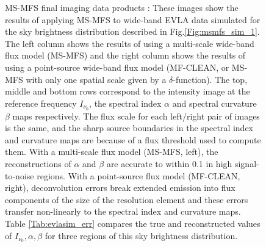 \documentclass[structabstract]{stylefiles/aa}
\begin{document}
\begin{figure}[t!]
\begin{center}
\end{center}
\caption[Example : MS-MFS final imaging data products]
{\small MS-MFS final imaging data products : 
These images show the results of applying MS-MFS to wide-band 
EVLA data simulated for the
sky brightness distribution described in Fig.\ref{Fig:msmfs_sim_1}.
The left column shows the results of using a multi-scale wide-band 
flux model (MS-MFS) and the right
column shows the results of using a point-source wide-band flux model
(MF-CLEAN, or MS-MFS with only one spatial scale given by a $\delta$-function). 
The top, middle and
bottom rows correspond to the intensity image at the reference frequency
$I_{\nu_0}$, the spectral index $\alpha$ and spectral curvature $\beta$ maps respectively.
The flux scale for each left/right pair of images is the same, and
the sharp source boundaries in the spectral index and curvature maps are because 
of a flux threshold used to compute them.
With a multi-scale flux model (MS-MFS, left), the reconstructions of $\alpha$
and $\beta$ are accurate to within 0.1 in high signal-to-noise regions.
With a point-source flux model (MF-CLEAN, right), deconvolution errors break
extended emission into flux components of the size of the resolution element
and these errors transfer non-linearly to the spectral index and curvature maps.
Table \ref{Tab:evlasim_err} compares the true and reconstructed values of $I_{\nu_0},\alpha,\beta$
for three regions of this sky brightness distribution.
}
\label{Fig:msmfs_sim_2}
\end{figure}
\end{document}
